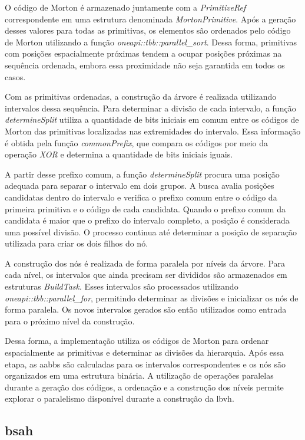 O código de Morton é armazenado juntamente com a \textit{PrimitiveRef} correspondente em uma estrutura denominada \textit{MortonPrimitive}. Após a geração desses valores para todas as primitivas, os elementos são ordenados pelo código de Morton utilizando a função \textit{oneapi::tbb::parallel\_sort}. Dessa forma, primitivas com posições espacialmente próximas tendem a ocupar posições próximas na sequência ordenada, embora essa proximidade não seja garantida em todos os casos.

Com as primitivas ordenadas, a construção da árvore é realizada utilizando intervalos dessa sequência. Para determinar a divisão de cada intervalo, a função \textit{determineSplit} utiliza a quantidade de bits iniciais em comum entre os códigos de Morton das primitivas localizadas nas extremidades do intervalo. Essa informação é obtida pela função \textit{commonPrefix}, que compara os códigos por meio da operação \textit{XOR} e determina a quantidade de bits iniciais iguais.

A partir desse prefixo comum, a função \textit{determineSplit} procura uma posição adequada para separar o intervalo em dois grupos. A busca avalia posições candidatas dentro do intervalo e verifica o prefixo comum entre o código da primeira primitiva e o código de cada candidata. Quando o prefixo comum da candidata é maior que o prefixo do intervalo completo, a posição é considerada uma possível divisão. O processo continua até determinar a posição de separação utilizada para criar os dois filhos do nó.

A construção dos nós é realizada de forma paralela por níveis da árvore. Para cada nível, os intervalos que ainda precisam ser divididos são armazenados em estruturas \textit{BuildTask}. Esses intervalos são processados utilizando \textit{oneapi::tbb::parallel\_for}, permitindo determinar as divisões e inicializar os nós de forma paralela. Os novos intervalos gerados são então utilizados como entrada para o próximo nível da construção.

Dessa forma, a implementação utiliza os códigos de Morton para ordenar espacialmente as primitivas e determinar as divisões da hierarquia. Após essa etapa, as \glspl{aabb} são calculadas para os intervalos correspondentes e os nós são organizados em uma estrutura binária. A utilização de operações paralelas durante a geração dos códigos, a ordenação e a construção dos níveis permite explorar o paralelismo disponível durante a construção da \gls{lbvh}.

\subsection{\gls{bsah}}

